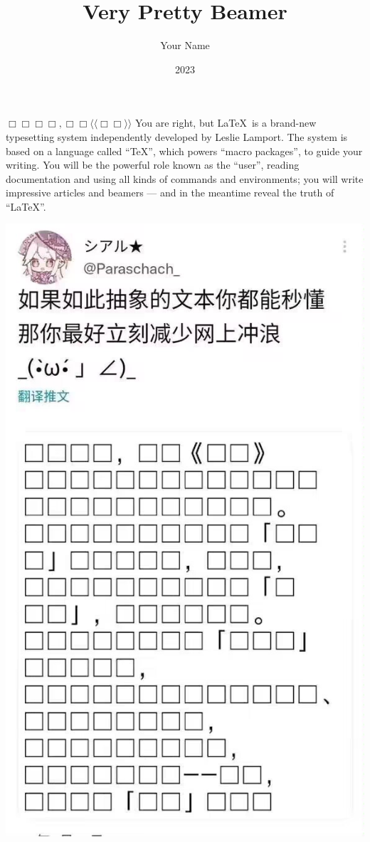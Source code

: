 \documentclass{beamer}
\title{Very Pretty Beamer}
\author{Your Name}
\institute{JI}
\date{2023}
\begin{document}
\frame{\titlepage}

\begin{frame}{$\Box\Box\Box\Box,\Box\Box\langle\langle\Box\Box\rangle\rangle$}
    You are right, but \LaTeX\ is a brand-new typesetting system
    independently developed by Leslie Lamport. The system is based
    on a language called ``\TeX'', which powers ``macro packages'',
    to guide your writing. You will be the powerful role known as
    the ``user'', reading documentation and using all kinds of
    commands and environments; you will write impressive articles
    and beamers — and in the meantime reveal the truth of ``\LaTeX''.


    \includegraphics[width=\textwidth]{genshin}
\end{frame}
\end{document}
